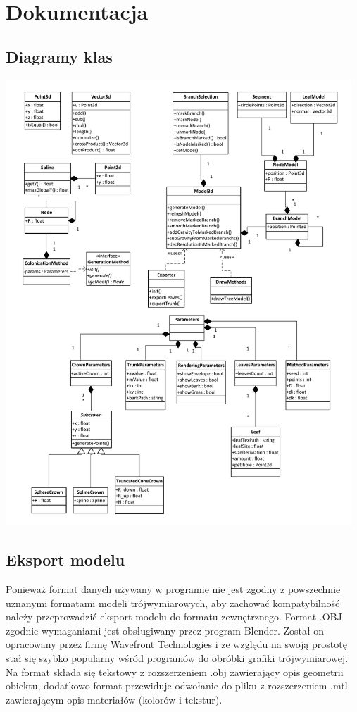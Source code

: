 \chapter{Dokumentacja}

\section{Diagramy klas}

\begin{center}
	\includegraphics[width=130mm]{images/treemaker_uml}
	\label{treemaker_uml}
\end{center}

\section{Eksport modelu}
Ponieważ format danych używany w programie nie jest zgodny z powszechnie uznanymi formatami modeli trójwymiarowych, aby zachować kompatybilność należy przeprowadzić eksport modelu do 
formatu zewnętrznego. Format .OBJ zgodnie wymaganiami jest obsługiwany przez program Blender.
Został on opracowany przez firmę Wavefront Technologies i ze względu na swoją prostotę stał się szybko
popularny wśród programów do obróbki grafiki trójwymiarowej. Na format składa się tekstowy z rozszerzeniem .obj 
zawierający opis geometrii obiektu, dodatkowo format przewiduje odwołanie do pliku z rozszerzeniem .mtl zawierającym
opis materiałów (kolorów i tekstur).


